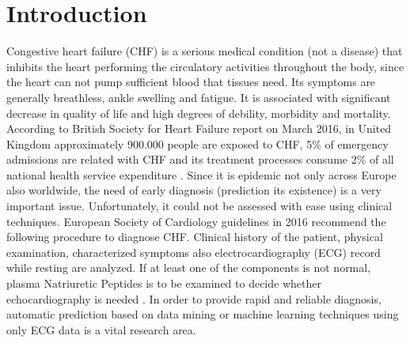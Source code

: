 \documentclass[twocolumn]{svjour3}
\begin{document}
\section{Introduction}
\label{intro}
Congestive heart failure (CHF) is a serious medical condition (not a disease) that inhibits the heart performing the circulatory activities throughout the body, since the heart can not pump sufficient blood that tissues need. Its symptoms are generally breathless, ankle swelling and fatigue. It is associated with significant decrease in quality of life and high degrees of debility, morbidity and mortality. According to British Society for Heart Failure report on March 2016, in United Kingdom approximately 900.000 people are exposed to CHF, 5\% of emergency admissions are related with  CHF and its treatment processes  consume 2\% of all national health service expenditure \cite{ref1}. Since it is epidemic not only across Europe also worldwide, the need of early diagnosis (prediction its existence) is a very important issue. Unfortunately, it could not be assessed with ease using clinical techniques. European Society of Cardiology guidelines in 2016 recommend the following procedure to diagnose CHF. Clinical history of the patient,  physical examination, characterized symptoms also electrocardiography (ECG) record while resting are analyzed. If at least one of the components is not normal,  plasma Natriuretic Peptides is to be examined to decide whether echocardiography is needed \cite{ref2}. In order to provide rapid and reliable  diagnosis,  automatic prediction based on data mining or machine learning techniques using only  ECG data is a vital research area. 
\end{document}

